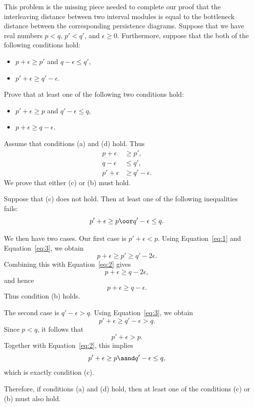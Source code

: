 \begin{problem}[3]
  This problem is the missing piece needed to complete our proof that the interleaving distance between two interval modules is equal to the bottleneck distance between the corresponding persistence diagrams. Suppose that we have real numbers $p < q$, $p' < q'$, and $\epsilon \geq 0$. Furthermore, suppose that the both of the following conditions hold:
  \begin{itemize}
    \item[(a)] $p + \epsilon \geq p'$ and $q - \epsilon\leq q'$,
    \item[(d)] $p' + \epsilon \geq q' - \epsilon$.
  \end{itemize}
  Prove that at least one of the following two conditions hold:
  \begin{itemize}
    \item[(c)] $p' + \epsilon \geq p$ and $q' - \epsilon\leq q$,
    \item[(b)] $p + \epsilon \geq q - \epsilon$.
  \end{itemize}
\end{problem}

\begin{solution}
  Assume that conditions (a) and (d) hold. Thus
  \begin{align}
    p + \epsilon &\ge p',\label{eq:1}\\
    q - \epsilon &\le q',\label{eq:2}\\
    p' + \epsilon &\ge q' - \epsilon\label{eq:3}
  .\end{align}
  We prove that either (c) or (b) must hold.

  Suppose that (c) does not hold. Then at least one of the following inequalities fails:
  \[%
    p' + \epsilon \ge p \oor q' - \epsilon \le q
  .\]%

  We then have two cases. Our first case is $p' + \epsilon < p$. Using Equation~\eqref{eq:1} and Equation~\eqref{eq:3}, we obtain
  \[%
    p + \epsilon \ge p' \ge q' - 2\epsilon
  .\]%
  Combining this with Equation~\eqref{eq:2} gives
  \[%
    p + \epsilon \ge q - 2\epsilon
  ,\]%
  and hence
  \[%
    p + \epsilon \ge q - \epsilon
  .\]%
  Thus condition (b) holds.

  The second case is $q' - \epsilon > q$. Using Equation~\eqref{eq:3}, we obtain
  \[%
    p' + \epsilon \ge q' - \epsilon > q
  .\]%
  Since $p < q$, it follows that
  \[%
    p' + \epsilon > p
  .\]%
  Together with Equation~\eqref{eq:2}, this implies
  \[%
    p' + \epsilon \ge p \aand q' - \epsilon \le q
  ,\]%
  which is exactly condition (c).

  Therefore, if conditions (a) and (d) hold, then at least one of the conditions (c) or (b) must also hold.
\end{solution}
